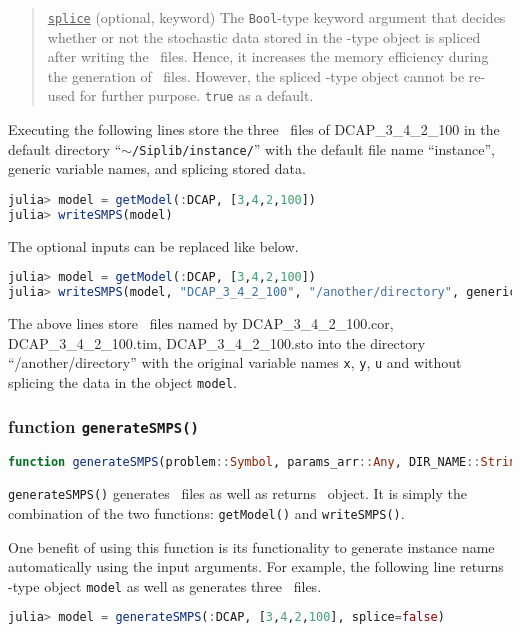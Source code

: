 \begin{quote}
	\noindent\underline{\texttt{splice}} (optional, keyword) The \texttt{Bool}-type keyword argument that decides whether or not the stochastic data stored in the \jumpmodel-type object is spliced after writing the \smps\ files. Hence, it increases the memory efficiency during the generation of \smps\ files. However, the spliced \jumpmodel-type object cannot be re-used for further purpose. \texttt{true} as a default.
\end{quote}

Executing the following lines store the three \smps\ files of DCAP\_3\_4\_2\_100 in the default directory ``\texttt{$\sim$/Siplib/instance/}''  with the default file name ``instance'', generic variable names, and splicing stored data.
\begin{lstlisting}[frame=single,language=julia]
julia> model = getModel(:DCAP, [3,4,2,100])
julia> writeSMPS(model)
\end{lstlisting}
The optional inputs can be replaced like below.
\begin{lstlisting}[frame=single,language=julia]
julia> model = getModel(:DCAP, [3,4,2,100])
julia> writeSMPS(model, "DCAP_3_4_2_100", "/another/directory", genericnames=false, splice=false)
\end{lstlisting}
The above lines store \smps\ files named by DCAP\_3\_4\_2\_100.cor, DCAP\_3\_4\_2\_100.tim, DCAP\_3\_4\_2\_100.sto into the directory ``/another/directory'' with the original variable names \texttt{x}, \texttt{y}, \texttt{u} and without splicing the data in the object \texttt{model}.



\subsubsection{function \texttt{generateSMPS()}}

\begin{lstlisting}[frame=single,language=julia]
function generateSMPS(problem::Symbol, params_arr::Any, DIR_NAME::String="$(dirname(@__FILE__))/../instance" ; seed::Int=1, lprelax::Int=0, genericnames::Bool=true, splice::Bool=true)
\end{lstlisting}

\texttt{generateSMPS()} generates \smps\ files as well as returns \jumpmodel\ object. It is simply the combination of the two functions: \texttt{getModel()} and \texttt{writeSMPS()}. 

One benefit of using this function is its functionality to generate instance name automatically using the input arguments. For example, the following line returns \jumpmodel-type object \texttt{model} as well as generates three \smps\ files.
\begin{lstlisting}[frame=single,language=julia]
julia> model = generateSMPS(:DCAP, [3,4,2,100], splice=false)
\end{lstlisting}

